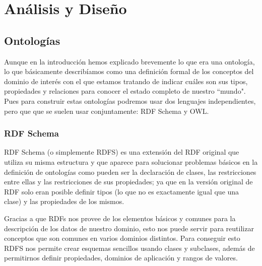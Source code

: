 \chapter{Análisis y Diseño}

\section{Ontologías}
Aunque en la introducción hemos explicado brevemente lo que era una ontología, lo que básicamente describíamos como una definición formal de los conceptos del dominio de interés con el que estamos tratando de indicar cuáles son sus tipos, propiedades y relaciones para conocer el estado completo de nuestro ``mundo". Pues para construir estas ontologías podremos usar dos lenguajes independientes, pero que que se suelen usar conjuntamente: RDF Schema y OWL.

\subsection{RDF Schema}
RDF Schema (o simplemente RDFS) es una extensión del RDF original que utiliza su misma estructura y que aparece para solucionar problemas básicos en la definición de ontologías como pueden ser la declaración de clases, las restricciones entre ellas y las restricciones de sus propiedades; ya que en la versión original de RDF solo eran posible definir tipos (lo que no es exactamente igual que una clase) y las propiedades de los mismos.

\bigskip
Gracias a que RDFs nos provee de los elementos básicos y comunes para la descripción de los datos de nuestro dominio, esto nos puede servir para reutilizar conceptos que son comunes en varios dominios distintos. Para conseguir esto RDFS nos permite crear esquemas sencillos usando clases y subclases, además de permitirnos definir propiedades, dominios de aplicación y rangos de valores.

